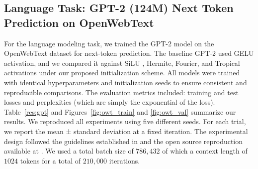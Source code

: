 \documentclass{article} %
\theoremstyle{plain}
\theoremstyle{definition}
\theoremstyle{remark}
\begin{document}
\subsection{Language Task: GPT-2 (124M) Next Token Prediction on OpenWebText}
For the language modeling task, we trained the GPT-2 model \cite{radford2019language} on the OpenWebText dataset \cite{Gokaslan2019OpenWeb} for next-token prediction. The baseline GPT-2 used GELU activation, and we compared it against SiLU \citep{elfwing2018sigmoid}, Hermite, Fourier, and Tropical activations under our proposed initialization scheme. All models were trained with identical hyperparameters and initialization seeds to ensure consistent and reproducible comparisons. The evaluation metrics included: training and test losses and perplexities (which are simply the exponential of the loss). Table~\ref{res:gpt} and Figures~\ref{fig:owt_train} and \ref{fig:owt_val} summarize our results. We reproduced all experiments using five different seeds. For each trial, we report the mean ± standard deviation at a fixed iteration. The experimental design followed the guidelines established in \cite{radford2019language} and the open source reproduction available at \cite{Karpathy2022}. We used a total batch size of $786,432$ of which a context length of $1024$ tokens for a total of $210,000$ iterations.

\begin{table}[!htbp]
\caption{Training and validation results for next-token prediction using GPT-2 (124M) model with different activations. Values are reported as mean ± standard deviation over 5 different seeds. Perplexity is computed as $\exp(\text{loss})$. p-values (two-tailed Student’s t-test assuming equal variances) compare each activation’s validation loss against GELU.}
\label{res:gpt}
\begin{center}
\end{center}
\end{table}
\end{document}
